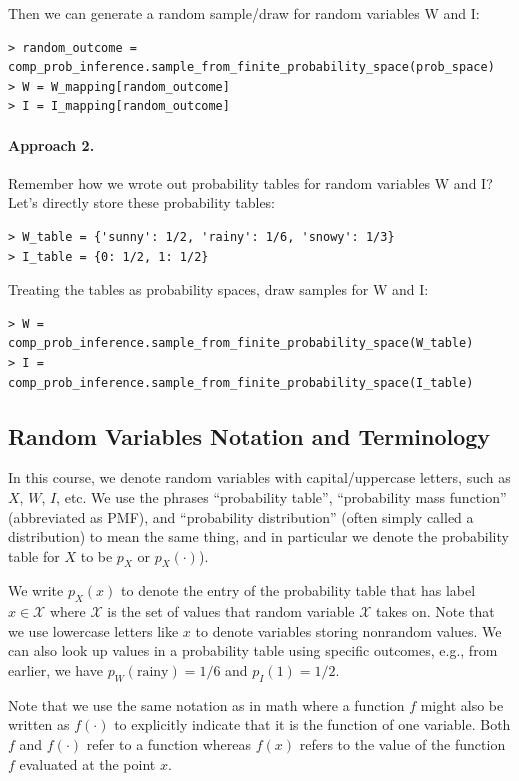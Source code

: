 \documentclass[6008notes.tex]{subfiles}
\begin{document}
Then we can generate a random sample/draw for random variables W and I:

\begin{lstlisting}
> random_outcome = comp_prob_inference.sample_from_finite_probability_space(prob_space)
> W = W_mapping[random_outcome]
> I = I_mapping[random_outcome]
\end{lstlisting}

\paragraph{Approach 2.} Remember how we wrote out probability tables for random variables W and I? Let's directly store these probability tables:

\begin{lstlisting}
> W_table = {'sunny': 1/2, 'rainy': 1/6, 'snowy': 1/3}
> I_table = {0: 1/2, 1: 1/2}
\end{lstlisting}

Treating the tables as probability spaces, draw samples for W and I:

\begin{lstlisting}
> W = comp_prob_inference.sample_from_finite_probability_space(W_table)
> I = comp_prob_inference.sample_from_finite_probability_space(I_table)
\end{lstlisting}


\subsection{Random Variables Notation and Terminology}

In this course, we denote random variables with capital/uppercase letters, such as $X$, $W$, $I$, etc. We use the phrases ``probability table'', ``probability mass function'' (abbreviated as PMF), and ``probability distribution'' (often simply called a distribution) to mean the same thing, and in particular we denote the probability table for $X$ to be $p_ X$ or $p_ X(\cdot )$).

We write $p_ X(x)$ to denote the entry of the probability table that has label $x \in \mathcal{X}$ where $\mathcal{X}$ is the set of values that random variable $\mathcal{X}$ takes on. Note that we use lowercase letters like $x$ to denote variables storing nonrandom values. We can also look up values in a probability table using specific outcomes, e.g., from earlier, we have $p_ W(\text {rainy}) = 1/6$ and $p_ I(1)=1/2$.

Note that we use the same notation as in math where a function $f$ might also be written as $f(\cdot )$ to explicitly indicate that it is the function of one variable. Both $f$ and $f(\cdot )$ refer to a function whereas $f(x)$ refers to the value of the function $f$ evaluated at the point $x$.
\end{document}
